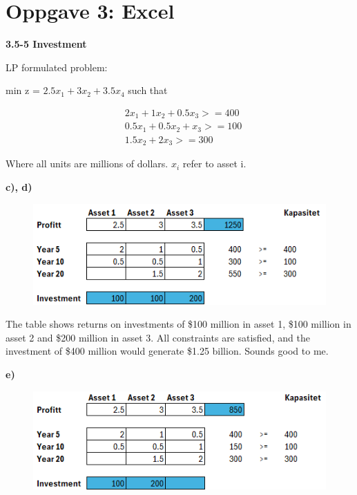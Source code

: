 \documentclass{article}
\begin{document}
    \pagebreak\section*{\textbf{Oppgave 3: Excel}}
    \small\textbf{3.5-5 Investment}
    
    LP formulated problem:
    
    min z = $2.5x_1 + 3x_2 + 3.5x_4$ such that
    
    \begin{align}
        & 2x_1 + 1x_2 + 0.5x_3 >= 400 \\
        & 0.5x_1 + 0.5x_2 + x_3 >= 100 \\
        & 1.5x_2 + 2x_3 >= 300
    \end{align}
    
    Where all units are millions of dollars. $x_i$ refer to asset i.
    
    \small\textbf{c), d)}
    
    \begin{figure}[ht]
        \centering
        \includegraphics[width=0.8\linewidth]{img/3c.PNG}
    \end{figure}
    
    The table shows returns on investments of \$100 million in asset 1, \$100 million in asset 2 and \$200 million in asset 3. All constraints are satisfied, and the investment of \$400 million would generate \$1.25 billion. Sounds good to me.  
    
    \small\textbf{e)}
    
    \begin{figure}[ht]
        \centering
        \includegraphics[width=0.8\linewidth]{img/4e.PNG}
    \end{figure}
\end{document}
